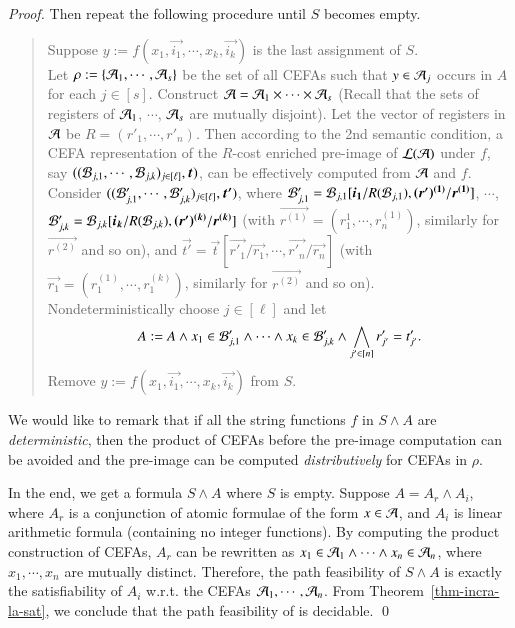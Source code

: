 \documentclass{llncs}
\begin{document}
\begin{proof}
Then repeat the following procedure until $S$ becomes empty.
%
\begin{quote}
Suppose $y := f(x_1, \vec{i_1}, \cdots, x_k, \vec{i_k})$ is the last assignment of $S$. 
\\
Let $\rho := \{\mathcal{A}_1, \cdots, \mathcal{A}_s\}$ be the set of all CEFAs such that $y \in \mathcal{A}_j$ occurs in $A$ for each $j \in [s]$. Construct $\mathcal{A} = \mathcal{A}_1 \times \cdots \times \mathcal{A}_s$ (Recall that the sets of registers of $\mathcal{A}_1$, $\cdots$, $\mathcal{A}_s$ are mutually disjoint). Let  the vector of registers in $\mathcal{A}$ be $R = (r'_1, \cdots, r'_n)$. Then according to the 2nd semantic condition, 
a CEFA representation of the $R$-cost enriched pre-image of $\mathcal{L}(\mathcal{A})$ under $f$, say $((\cB_{j, 1}, \cdots, \cB_{j, k})_{j \in [\ell]}, \vec{t})$, can be effectively computed from $\mathcal{A}$ and $f$. Consider $((\cB'_{j, 1}, \cdots, \cB'_{j, k})_{j \in [\ell]}, \vec{t'})$, where $\cB'_{j, 1} = \cB_{j, 1}[\vec{i_1}/R(\cB_{j,1}), \vec{(r')^{(1)}}/\vec{r^{(1)}}]$, $\cdots$, $\cB'_{j,k}=\cB_{j,k}[\vec{i_k}/R(\cB_{j,k}), \vec{(r')^{(k)}}/\vec{r^{(k)}}]$ (with $\vec{r^{(1)}}= (r^{1}_1, \cdots, r^{(1)}_n)$, similarly for $\vec{r^{(2)}}$ and so on), and $\vec{t'} = \vec{t}[\vec{r'_1}/\vec{r_1}, \cdots, \vec{r'_n}/\vec{r_n}]$ (with $\vec{r_1} = (r^{(1)}_1, \cdots, r^{(k)}_1)$, similarly for $\vec{r^{(2)}}$ and so on). 
\\
Nondeterministically choose $j \in [\ell]$ and let 
$$A:= A \wedge x_1 \in \mathcal{B}'_{j, 1} \wedge \cdots \wedge x_k \in \mathcal{B}'_{j, k}  \wedge \bigwedge \limits_{j' \in [n]} r'_{j'} = t'_{j'}.$$
%
Remove $y := f(x_1, \vec{i_1}, \cdots, x_k, \vec{i_k})$ from $S$.
\end{quote}

We would like to remark that if all the string functions $f$ in $S \wedge A$ are \emph{deterministic}, then the product of CEFAs before the pre-image computation can be avoided and the pre-image can be computed \emph{distributively} for CEFAs in $\rho$.

In the end, we get a formula $S \wedge A$ where $S$ is empty. Suppose $A = A_r \wedge A_i$, where $A_r$ is a conjunction of atomic formulae of the form $x \in \mathcal{A}$, and $A_i$ is linear arithmetic formula (containing no integer functions). By computing the product construction of CEFAs, $A_r$ can be rewritten as $x_1 \in \mathcal{A}_1 \wedge \cdots \wedge x_n \in \mathcal{A}_n$, where $x_1,\cdots, x_n$ are mutually distinct. Therefore, the path feasibility of $S \wedge A$ is exactly the satisfiability of $A_i$ w.r.t. the CEFAs $\mathcal{A}_1, \cdots, \mathcal{A}_n$. From Theorem~\ref{thm-incra-la-sat}, we conclude that the path feasibility of  {\slint} is decidable.
\qed
\end{proof}
\end{document}
